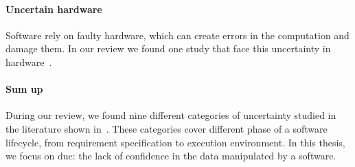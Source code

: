 \paragraph{Uncertain hardware}
Software rely on faulty hardware, which can create errors in the computation and damage them.
In our review we found one study that face this uncertainty in hardware~\cite{DBLP:conf/oopsla/CarbinMR13}.

\paragraph{Sum up}
During our review, we found nine different categories of uncertainty studied in the literature shown in~.
These categories cover different phase of a software lifecycle, from requirement specification to execution environment.
In this thesis, we focus on \gls{duc}: the lack of confidence in the data manipulated by a software.

